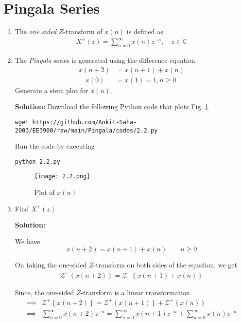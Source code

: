 \documentclass[journal,12pt,twocolumn]{IEEEtran}
\newcommand{\solution}{\noindent \textbf{Solution: }}
\providecommand{\brak}[1]{\ensuremath{\left(#1\right)}}
\providecommand{\cbrak}[1]{\ensuremath{\left\{#1\right\}}}
\numberwithin{equation}{section}
\renewcommand\thesection{\arabic{section}}
\begin{document}
\section{Pingala Series}
\begin{enumerate}[label=\thesection.\arabic*,ref=\thesection.\theenumi]
\item The {\em one sided} $Z$-transform of $x(n)$ is defined as 
\begin{align}
	X^{+}(z) = \sum_{n = 0}^{\infty}x(n)z^{-n}, \quad z \in \mathbb{C}
\label{eq:one-Z}
\end{align}
	\item The {\em Pingala} series is generated using the difference equation 
\begin{align}
	x(n+2) &= x\brak{n+1} + x\brak{n} \\  \quad x(0) &= x(1) = 1, n \ge 0
	\label{eq:10-pingala}
\end{align}
Generate a stem plot for $x(n)$.

\solution
Download the following Python code that plots Fig. \ref{fig-1}
\begin{lstlisting}
wget https://github.com/Ankit-Saha-2003/EE3900/raw/main/Pingala/codes/2.2.py
\end{lstlisting}

Run the code by executing
\begin{lstlisting}
python 2.2.py
\end{lstlisting}

\begin{figure}[!htp]
    \texttt{[image: 2.2.png]}
    \caption{Plot of $x(n)$}
    \label{fig-1}
\end{figure}


\newpage
\item Find $X^{+}(z)$

\solution 

We have
\begin{equation}
	x(n+2) = x(n+1) + x(n) \qquad n \ge 0
\end{equation}

On taking the one-sided $Z$-transform on both sides of the equation, we get
\begin{align}
	\mathcal{Z}^+\cbrak{x(n+2)} = \mathcal{Z}^+\cbrak{x(n+1) + x(n)}
\end{align}

Since, the one-sided $Z$-transform is a linear transformation
\begin{align}
    \implies &\mathcal{Z}^+\cbrak{x(n + 2)} = \mathcal{Z}^+\cbrak{x(n + 1)} + \mathcal{Z}^+\cbrak{x(n)} \\
    \implies &\sum_{n=0}^\infty x(n+2)z^{-n} = \sum_{n=0}^\infty x(n+1)z^{-n} + \sum_{n=0}^\infty x(n)z^{-n} 
\end{align}


\end{enumerate}
\end{document}
